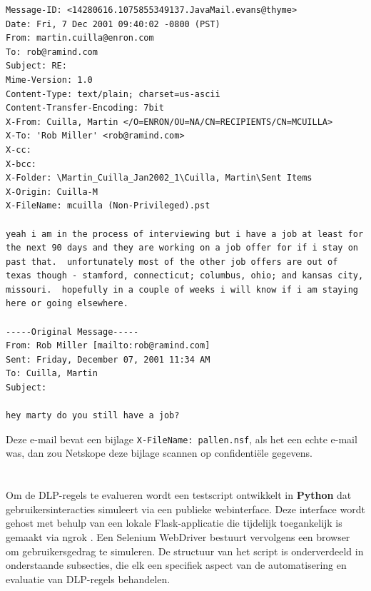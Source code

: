 \begin{lstlisting}[style=custompython, caption={Voorbeeld van een e-mail uit de Enron dataset}, label={lst:dlp-e-mail-ex}, captionpos=b]
Message-ID: <14280616.1075855349137.JavaMail.evans@thyme>
Date: Fri, 7 Dec 2001 09:40:02 -0800 (PST)
From: martin.cuilla@enron.com
To: rob@ramind.com
Subject: RE:
Mime-Version: 1.0
Content-Type: text/plain; charset=us-ascii
Content-Transfer-Encoding: 7bit
X-From: Cuilla, Martin </O=ENRON/OU=NA/CN=RECIPIENTS/CN=MCUILLA>
X-To: 'Rob Miller' <rob@ramind.com>
X-cc: 
X-bcc: 
X-Folder: \Martin_Cuilla_Jan2002_1\Cuilla, Martin\Sent Items
X-Origin: Cuilla-M
X-FileName: mcuilla (Non-Privileged).pst

yeah i am in the process of interviewing but i have a job at least for the next 90 days and they are working on a job offer for if i stay on past that.  unfortunately most of the other job offers are out of texas though - stamford, connecticut; columbus, ohio; and kansas city, missouri.  hopefully in a couple of weeks i will know if i am staying here or going elsewhere.

-----Original Message-----
From: Rob Miller [mailto:rob@ramind.com]
Sent: Friday, December 07, 2001 11:34 AM
To: Cuilla, Martin
Subject: 

hey marty do you still have a job?
\end{lstlisting}

Deze e-mail bevat een bijlage \texttt{X-FileName: pallen.nsf}, als het een echte e-mail was, dan zou Netskope deze bijlage scannen op confidentiële gegevens.

\section{}
\label{sec:automatisering-poc}

Om de DLP-regels te evalueren wordt een testscript ontwikkelt in \textbf{Python} dat gebruikersinteracties simuleert via een publieke webinterface. 
Deze interface wordt gehost met behulp van een lokale Flask-applicatie die tijdelijk toegankelijk is gemaakt via ngrok \autocite{Ngrok2025Flask}. 
Een Selenium WebDriver bestuurt vervolgens een browser om gebruikersgedrag te simuleren.
De structuur van het script is onderverdeeld in onderstaande subsecties, die elk een specifiek aspect van de automatisering en evaluatie van DLP-regels behandelen.

